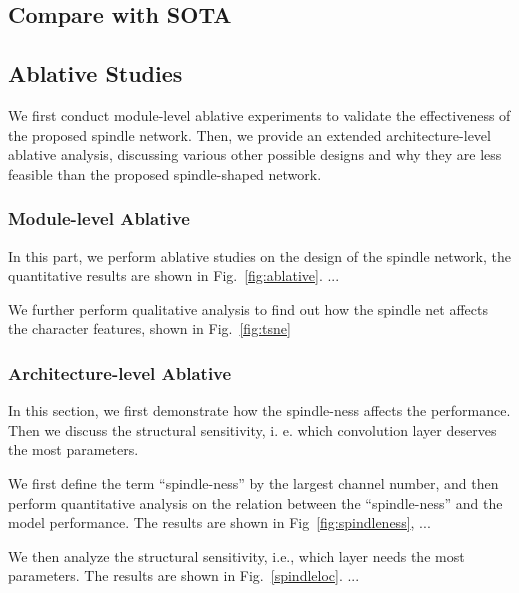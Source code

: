 
\subsection{Compare with SOTA}




\subsection{Ablative Studies}
We first conduct module-level ablative experiments to validate the effectiveness of the proposed spindle network. Then, we provide an extended architecture-level ablative analysis, discussing various other possible designs and why they are less feasible than the proposed spindle-shaped network.  

\subsubsection{Module-level Ablative}
In this part, we perform ablative studies on the design of the spindle network, the quantitative results are shown in Fig.~\ref{fig:ablative}. ...%



We further perform qualitative analysis to find out how the spindle net affects the character features, shown in Fig.~\ref{fig:tsne}  




\subsubsection{Architecture-level Ablative}
In this section, we first demonstrate how the spindle-ness affects the performance. Then we discuss the structural sensitivity, i. e. which convolution layer deserves the most parameters.

We first define the term ``spindle-ness'' by the largest channel number, %
and then perform quantitative analysis on the relation between the ``spindle-ness'' and the model performance.
The results are shown in Fig~\ref{fig:spindleness}, ... %


We then analyze the structural sensitivity, i.e., which layer needs the most parameters. The results are shown in Fig.~\ref{spindleloc}. ... %



